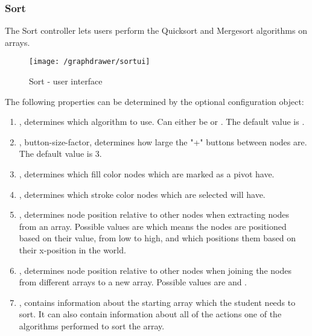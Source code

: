 \subsubsection{Sort}
The Sort controller lets users perform the Quicksort and Mergesort algorithms on arrays.
\begin{figure}[H]
    \centering
    \texttt{[image: /graphdrawer/sortui]}
    \caption{Sort - user interface}
    \label{fig:graphdrawerSortUserInterface}
\end{figure}
The following properties can be determined by the optional configuration object:
\begin{enumerate}
    \item {}, determines which algorithm to use. Can either be  or . The default value is .
    \item {}, button-size-factor, determines how large the "+" buttons between nodes are. The default value is 3.
    \item {}, determines which fill color nodes which are marked as a pivot have.
    \item {}, determines which stroke color nodes which are selected will have.
    \item {}, determines node position relative to other nodes when extracting nodes from an array. Possible values are  which means the nodes are positioned based on their value, from low to high, and  which positions them based on their x-position in the world.
    \item {}, determines node position relative to other nodes when joining the nodes from different arrays to a new array. Possible values are  and .
    \item {}, contains information about the starting array which the student needs to sort. It can also contain information about all of the actions one of the algorithms performed to sort the array.
\end{enumerate}
